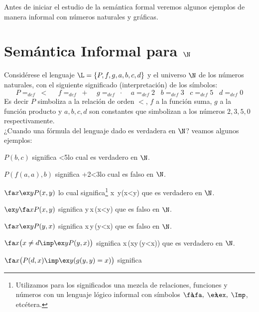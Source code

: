 \documentclass[11pt,letterpaper]{article}
\begin{document}
Antes de iniciar el estudio de la semántica  formal veremos algunos ejemplos 
de manera informal con números naturales y gráficas.


\section{Semántica Informal para $\N$}


Considérese el lenguaje $\L=\{P,f,g,a,b,c,d\}$ y el universo $\N$ de los números
naturales, con el siguiente significado (interpretación) de los símbolos:
\begin{equation}
P =_{def} \;<\;\;\;\;\; f=_{def} \;+ \;\;\;\; g=_{def}
\;\cdot\;\;\;\;a=_{def}2\;\;\;b=_{def}3\;\;\; c=_{def}5\;\;\;d=_{def}0
\end{equation}
Es decir $P$ simboliza a la relación de orden $<$, $f$ a la función suma, $g$
a la función producto y $a,b,c,d$ son
constantes que simbolizan a los números $2,3,5,0$ respectivamente.\\

¿Cuando una fórmula del lenguaje dado es verdadera en $\N$?
veamos algunos ejemplos:

\newcommand{\fabb}{\fa\hspace{-0.18cm}\fa}
\newcommand{\exbb}{\ex\hspace{-0.163cm}\ex}

\be
\item $P(b,c)$ significa <5\eeqs lo cual es verdadero en $\N$.
\item $P(f(a,a),b)$ significa +2<3\eeqs lo cual es falso en $\N$.
\item $\fa x\ex y P(x,y)$ lo cual significa\footnote{Utilizamos para los significados una mezcla de
  relaciones, funciones y números con un lenguaje lógico informal con símbolos
  $\fa\hspace{-0.15cm}\fa,\;\ex\hspace{-0.15cm}\ex,\;\Imp$, etcétera.}
\beqs 
\fabb
  x\in\N\,\exbb
  y\in\N(x<y)
\eeqs
que es verdadero en $\N$. 
\item $\ex y\fa xP(x,y)$ significa
\beqs\exbb y\in\N\,\fabb x\in\N\,(x<y)\eeqs
que es falso en $\N$.
\item $\fa x\ex yP(y,x)$ significa
\beqs
\fabb x\in\N\,\exbb y\in\N\,(y<x)
\eeqs
que es falso en $\N$.
\item $\fa x\big(x\neq d\imp\ex yP(y,x)\big)$ significa 
\beqs
\fabb x\in\N\,\big(x\Imp\exbb y\in\N\,(y<x)\big)
\eeqs
que es verdadero en $\N$.
\item $\fa x\big(P(d,x)\imp \ex y(g(y,y)=x)\big)$ significa
\end{document}
